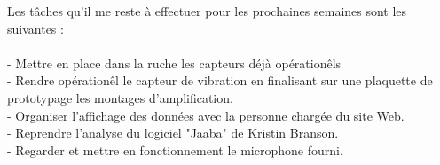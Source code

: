 \documentclass[11pt,french,a4paper]{article}
\begin{document}
Les tâches qu'il me reste à effectuer pour les prochaines semaines sont les suivantes :
\\
\\- Mettre en place dans la ruche les capteurs déjà opérationêls
\\- Rendre opérationêl le capteur de vibration en finalisant sur une plaquette de prototypage les montages d'amplification.
\\- Organiser l'affichage des données avec la personne chargée du site Web. 
\\- Reprendre l'analyse du logiciel "Jaaba" de  Kristin Branson. 
\\- Regarder et mettre en fonctionnement le microphone fourni.
\newpage
\listoffigures
\end{document}
